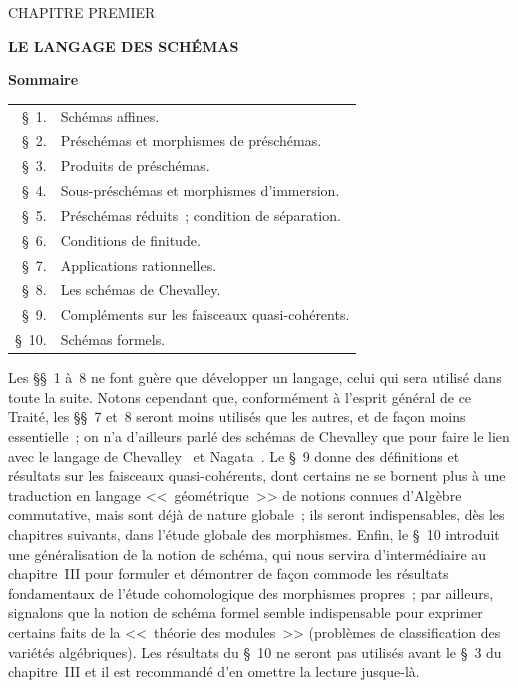 \clearpage
{}
\label{chapter:I-fr}

\begin{center}
{\large CHAPITRE PREMIER\par}
\vspace{1.5em}
{\Large\bfseries LE LANGAGE DES SCHÉMAS\par}
\vspace{1.8em}
{\bfseries Sommaire\par}
\end{center}

\medskip
\begin{tabular}{@{}r@{\ }l@{}}
\S~1.  & Schémas affines.\\
\S~2.  & Préschémas et morphismes de préschémas.\\
\S~3.  & Produits de préschémas.\\
\S~4.  & Sous-préschémas et morphismes d'immersion.\\
\S~5.  & Préschémas réduits~; condition de séparation.\\
\S~6.  & Conditions de finitude.\\
\S~7.  & Applications rationnelles.\\
\S~8.  & Les schémas de Chevalley.\\
\S~9.  & Compléments sur les faisceaux quasi-cohérents.\\
\S~10. & Schémas formels.
\end{tabular}

\medskip
Les \S\S~1 à~8 ne font guère que développer un langage, celui qui sera utilisé
dans toute la suite. Notons cependant que, conformément à l'esprit général de
ce Traité, les \S\S~7 et~8 seront moins utilisés que les autres, et de façon
moins essentielle~; on n'a d'ailleurs parlé des schémas de Chevalley que pour
faire le lien avec le langage de Chevalley~\cite{I-1} et Nagata~\cite{I-9}. Le
\S~9 donne des définitions et résultats sur les faisceaux quasi-cohérents, dont
certains ne se bornent plus à une traduction en langage <<~géométrique~>> de
notions connues d'Algèbre commutative, mais sont déjà de nature globale~; ils
seront indispensables, dès les chapitres suivants, dans l'étude globale des
morphismes. Enfin, le \S~10 introduit une généralisation de la notion de
schéma, qui nous servira d'intermédiaire au chapitre~III pour formuler et
démontrer de façon commode les résultats fondamentaux de l'étude
cohomologique des morphismes propres~; par ailleurs, signalons que la notion
de schéma formel semble indispensable pour exprimer certains faits de la
<<~théorie des modules~>> (problèmes de classification des variétés
algébriques). Les résultats du \S~10 ne seront pas utilisés avant le \S~3 du
chapitre~III et il est recommandé d'en omettre la lecture jusque-là.

\clearpage
